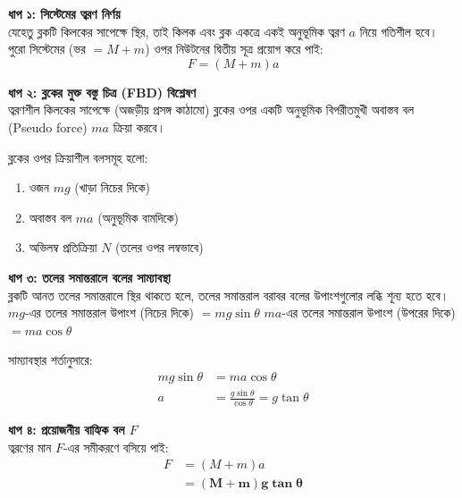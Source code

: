\documentclass[12pt, a4paper]{article}
\begin{document}
\begin{tcolorbox}[solutionbox={সমাধান (Solution)}]
    \noindent
    \textbf{ধাপ ১: সিস্টেমের ত্বরণ নির্ণয়} \\
    যেহেতু ব্লকটি কিলকের সাপেক্ষে স্থির, তাই কিলক এবং ব্লক একত্রে একই অনুভূমিক ত্বরণ $a$ নিয়ে গতিশীল হবে। পুরো সিস্টেমের (ভর $= M + m$) ওপর নিউটনের দ্বিতীয় সূত্র প্রয়োগ করে পাই:
    \[ F = (M + m)a \]
    
    \vspace{0.5em}
    \noindent\textbf{ধাপ ২: ব্লকের মুক্ত বস্তু চিত্র (FBD) বিশ্লেষণ} \\
    ত্বরণশীল কিলকের সাপেক্ষে (অজড়ীয় প্রসঙ্গ কাঠামো) ব্লকের ওপর একটি অনুভূমিক বিপরীতমুখী অবাস্তব বল (Pseudo force) $ma$ ক্রিয়া করবে। 
    
    ব্লকের ওপর ক্রিয়াশীল বলসমূহ হলো:
    \begin{enumerate}[topsep=0pt, itemsep=0pt]
        \item ওজন $mg$ (খাড়া নিচের দিকে)
        \item অবাস্তব বল $ma$ (অনুভূমিক বামদিকে)
        \item অভিলম্ব প্রতিক্রিয়া $N$ (তলের ওপর লম্বভাবে)
    \end{enumerate}
    
    \vspace{0.5em}
    \noindent\textbf{ধাপ ৩: তলের সমান্তরালে বলের সাম্যাবস্থা} \\
    ব্লকটি আনত তলের সমান্তরালে স্থির থাকতে হলে, তলের সমান্তরাল বরাবর বলের উপাংশগুলোর লব্ধি শূন্য হতে হবে। 
    $mg$-এর তলের সমান্তরাল উপাংশ (নিচের দিকে) $= mg \sin\theta$ 
    $ma$-এর তলের সমান্তরাল উপাংশ (উপরের দিকে) $= ma \cos\theta$
    
    সাম্যাবস্থার শর্তানুসারে:
    \begin{align*}
        mg \sin\theta &= ma \cos\theta \\
        a &= \frac{g \sin\theta}{\cos\theta} = g \tan\theta
    \end{align*}
    
    \vspace{0.5em}
    \noindent\textbf{ধাপ ৪: প্রয়োজনীয় বাহ্যিক বল $F$} \\
    ত্বরণের মান $F$-এর সমীকরণে বসিয়ে পাই:
    \begin{align*}
        F &= (M + m) a \\
          &= \mathbf{(M + m) g \tan\theta}
    \end{align*}
\end{tcolorbox}
\end{document}

